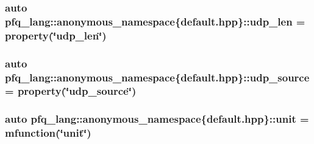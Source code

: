 \hypertarget{namespacepfq__lang_1_1anonymous__namespace_02default_8hpp_03_ab0dcf23db0f218100e7fe51562e0add1}{
\subsubsection[{udp\+\_\+len}]{\setlength{\rightskip}{0pt plus 5cm}auto pfq\+\_\+lang\+::anonymous\+\_\+namespace\{default.\+hpp\}\+::udp\+\_\+len = {\bf property}(\char`\"{}udp\+\_\+len\char`\"{})}}\label{namespacepfq__lang_1_1anonymous__namespace_02default_8hpp_03_ab0dcf23db0f218100e7fe51562e0add1}
\hypertarget{namespacepfq__lang_1_1anonymous__namespace_02default_8hpp_03_a7d2943522cfb795fcb82c894dba83292}{
\subsubsection[{udp\+\_\+source}]{\setlength{\rightskip}{0pt plus 5cm}auto pfq\+\_\+lang\+::anonymous\+\_\+namespace\{default.\+hpp\}\+::udp\+\_\+source = {\bf property}(\char`\"{}udp\+\_\+source\char`\"{})}}\label{namespacepfq__lang_1_1anonymous__namespace_02default_8hpp_03_a7d2943522cfb795fcb82c894dba83292}
\hypertarget{namespacepfq__lang_1_1anonymous__namespace_02default_8hpp_03_ae78caafebdc64f9180032a049b7c3b3a}{
\subsubsection[{unit}]{\setlength{\rightskip}{0pt plus 5cm}auto pfq\+\_\+lang\+::anonymous\+\_\+namespace\{default.\+hpp\}\+::unit = {\bf mfunction}(\char`\"{}unit\char`\"{})}}\label{namespacepfq__lang_1_1anonymous__namespace_02default_8hpp_03_ae78caafebdc64f9180032a049b7c3b3a}
